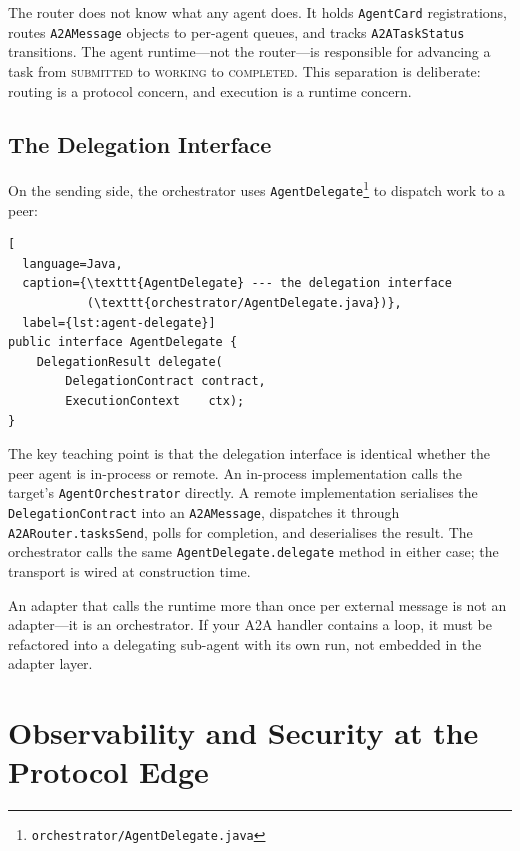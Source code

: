 The router does not know what any agent does.  It holds
\lstinline{AgentCard} registrations, routes
\lstinline{A2AMessage} objects to per-agent queues, and tracks
\lstinline{A2ATaskStatus} transitions.  The agent runtime---not the
router---is responsible for advancing a task from
\textsc{submitted} to \textsc{working} to \textsc{completed}.  This
separation is deliberate: routing is a protocol concern, and
execution is a runtime concern.

\subsection{The Delegation Interface}
\label{subsec:a2a-delegation}

On the sending side, the orchestrator uses
\lstinline{AgentDelegate}\footnote{\texttt{orchestrator/AgentDelegate.java}}
to dispatch work to a peer:

\begin{lstlisting}[
  language=Java,
  caption={\texttt{AgentDelegate} --- the delegation interface
           (\texttt{orchestrator/AgentDelegate.java})},
  label={lst:agent-delegate}]
public interface AgentDelegate {
    DelegationResult delegate(
        DelegationContract contract,
        ExecutionContext    ctx);
}
\end{lstlisting}

The key teaching point is that the delegation interface is identical
whether the peer agent is in-process or remote.  An in-process
implementation calls the target's \lstinline{AgentOrchestrator}
directly.  A remote implementation serialises the
\lstinline{DelegationContract} into an \lstinline{A2AMessage},
dispatches it through \lstinline{A2ARouter.tasksSend}, polls for
completion, and deserialises the result.  The orchestrator calls the
same \lstinline{AgentDelegate.delegate} method in either case; the
transport is wired at construction time.

\begin{warningbox}
An adapter that calls the runtime more than once per external
message is not an adapter---it is an orchestrator.  If your A2A
handler contains a loop, it must be refactored into a delegating
sub-agent with its own run, not embedded in the adapter layer.
\end{warningbox}

\section{Observability and Security at the Protocol Edge}
\label{sec:observability-security}

